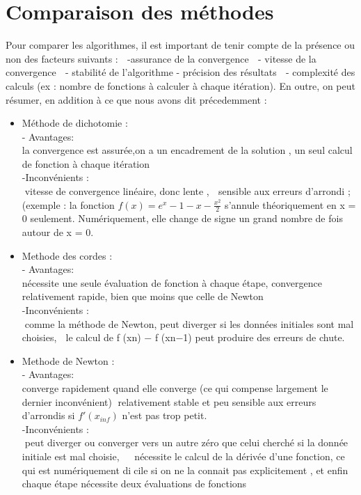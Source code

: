 \documentclass{article}
\begin{document}
\newpage
\section{Comparaison des méthodes}
Pour comparer les algorithmes, il est important de tenir compte de la présence ou non des facteurs suivants :
 -assurance de la convergence
 - vitesse de la convergence
 - stabilité de l'algorithme - précision des résultats
 - complexité des calculs (ex : nombre de fonctions à calculer à chaque itération). 
En outre, on peut résumer, en addition à ce que nous avons dit précedemment :
\begin{itemize}
    \item  Méthode de dichotomie : \\
        - Avantages:  \\
        la convergence est assurée,\quad on a un encadrement de la solution , \quad un seul calcul de fonction à chaque itération \\
        -Inconvénients : \\
           vitesse de convergence linéaire, donc lente , \quad
           sensible aux erreurs d'arrondi ; (exemple : la fonction $f(x) = e^x - 1 - x - \frac{x^2}{2} $ s'annule théoriquement en x = 0 seulement. Numériquement, elle change de signe un grand nombre de fois autour de x = 0.
    
    \item  Methode des cordes : \\
             - Avantages:  \\
        nécessite une seule évaluation de fonction à chaque étape\quad , convergence relativement rapide, bien que moins que celle de Newton \\
        -Inconvénients : \\
         comme la méthode de Newton, peut diverger si les données initiales sont mal choisies, \quad
          le calcul de f (xn) − f (xn−1) peut produire des erreurs de chute.
    \item  Methode de Newton : \\
             - Avantages:  \\
        converge rapidement quand elle converge (ce qui compense largement le dernier inconvénient)\quad  relativement stable et peu sensible aux erreurs d'arrondis si $f'(x_{inf})$ n'est pas trop petit. \\
        -Inconvénients : \\
          peut diverger ou converger vers un autre zéro que celui cherché si la donnée initiale
est mal choisie, \quad
           nécessite le calcul de la dérivée d'une fonction, ce qui est numériquement dicile si
on ne la connait pas explicitement , et enfin \quad chaque étape nécessite deux évaluations de fonctions
    
\end{itemize}
    
\end{document}
